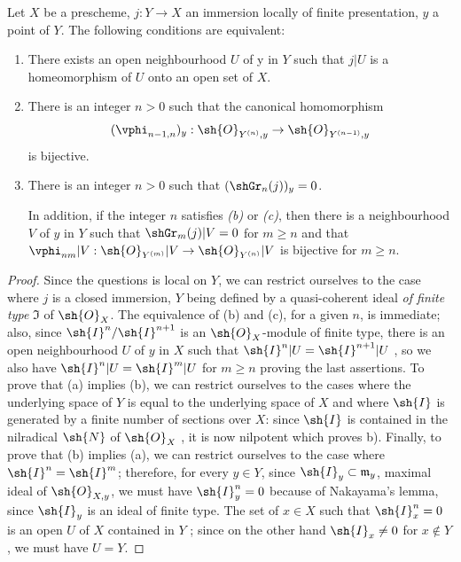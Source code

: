 \begin{proposition}[16.1.9]
\label{IV.16.1.9}
Let $X$ be a prescheme, $j: Y \to X$ an immersion locally of finite presentation, $y$ a point of $Y$. The following conditions are equivalent:
\begin{enumerate}
  \item[(a)] There exists an open neighbourhood $U$ of y in $Y$ such that $j|U$ is a homeomorphism of $U$ onto an open set of $X$.
  \item[(b)] There is an integer $n>0$ such that the canonical homomorphism
  \[
    (\vphi_{n-1,n})_y: \sh{O}_{Y^{(n)},y} \to \sh{O}_{Y^{(n-1)},y}
  \]
  is bijective.
  \item[(c)] There is an integer $n>0$ such that $(\shGr_n(j))_y = 0$.
  
  In addition, if the integer $n$ satisfies \emph{(b)} or \emph{(c)}, then there is a neighbourhood $V$ of $y$ in $Y$ such that $\shGr_m(j)|V = 0$ for $m \geq n$ and that $\vphi_{nm}|V: \sh{O}_{Y^{(m)}}|V \to \sh{O}_{Y^{(n)}}|V$ is bijective for $m \geq n$. 
\end{enumerate}
\end{proposition}

\begin{proof}
Since the questions is local on $Y$, we can restrict ourselves to the case where $j$ is a closed immersion, $Y$ being defined by a quasi-coherent ideal \emph{of finite type} $\mathfrak{I}$ of $\sh{O}_X$.
The equivalence of (b) and (c), for a given $n$, is immediate;
also, since $\sh{I}^n/\sh{I}^{n+1}$ is an $\sh{O}_X$-module of finite type, there is an open neighbourhood $U$ of $y$ in $X$ such that $\sh{I}^n|U = \sh{I}^{n+1}|U$ , so we also have $\sh{I}^n|U = \sh{I}^m|U$ for $m \geq n$ proving the last assertions.
To prove that (a) implies (b), we can restrict ourselves to the cases where the underlying space of $Y$ is equal to the underlying space of $X$ and where $\sh{I}$ is generated by a finite number of sections over $X$:
since $\sh{I}$ is contained in the nilradical $\sh{N}$ of $\sh{O}_X$ , it is now nilpotent which proves b).
Finally, to prove that (b) implies (a), we can restrict ourselves to the case where $\sh{I}^n = \sh{I}^m$; 
therefore, for every $y \in Y$, since $\sh{I}_y \subset \mathfrak{m}_y$, maximal ideal of $\sh{O}_{X,y}$, we must have $\sh{I}^n_y = 0$ because of Nakayama's lemma, since $\sh{I}_y$ is an ideal of finite type.
The set of $x \in X$ such that $\sh{I}^n_x = 0$ is an open $U$ of $X$ contained in $Y$ ;
since on the other hand $\sh{I}_x \neq 0$ for $x \notin Y$, we must have $U = Y$.
\end{proof}


